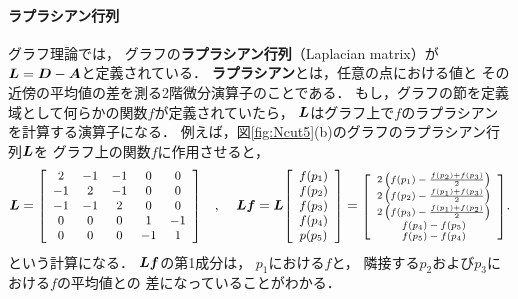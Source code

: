 \paragraph{ラプラシアン行列}
グラフ理論では，
グラフの{\bf ラプラシアン行列}（Laplacian matrix）が
$\mtr L=\mtr D-\mtr A$と定義されている．
{\bf ラプラシアン}とは，任意の点における値と
その近傍の平均値の差を測る2階微分演算子のことである．
もし，グラフの節を定義域として何らかの関数$f$が定義されていたら，
$\mtr L$はグラフ上で$f$のラプラシアンを計算する演算子になる．
例えば，図\ref{fig:Ncut5}(b)のグラフのラプラシアン行列$\mtr L$を
グラフ上の関数$f$に作用させると，
\begin{equation}
\mtr L
=\smatrix{\small}{ccccc}
{
2 & -1 & -1 & 0 & 0\\
-1 & 2 & -1 & 0 & 0\\
-1 & -1 & 2 & 0 & 0\\
0 & 0 & 0 & 1 & -1\\
0 & 0 & 0 & -1 & 1}
\quad \mbox{, }\quad
\mtr L\vec f=
\mtr L
\smatrix{\small}{c}{f(p_1)\\ f(p_2)\\ f(p_3)\\ f(p_4)\\ p(p_5)}
=
\smatrix{\scriptsize}{c}{
2\left(f(p_1)-\frac{f(p_2)+f(p_3)}{2}\right)\\
2\left(f(p_2)-\frac{f(p_1)+f(p_3)}{2}\right)\\
2\left(f(p_3)-\frac{f(p_1)+f(p_2)}{2}\right)\\
f(p_4)-f(p_5)\\
f(p_5)-f(p_4)}.
\end{equation}
という計算になる．
$\mtr L\vec f$の第1成分は，
$p_1$における$f$と，
隣接する$p_2$および$p_3$における$f$の平均値との
差になっていることがわかる．


